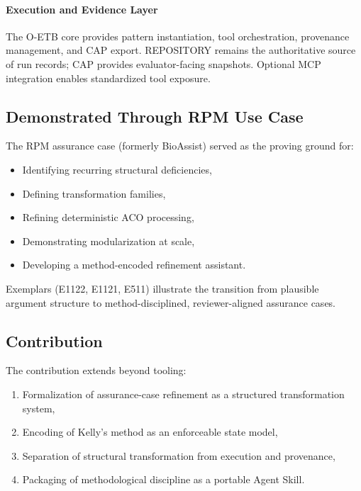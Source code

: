 \documentclass[12pt,twoside,a4paper]{article}
\begin{document}
\paragraph{Execution and Evidence Layer}
The O-ETB core provides pattern instantiation, tool orchestration, provenance management, and CAP export. REPOSITORY remains the authoritative source of run records; CAP provides evaluator-facing snapshots. Optional MCP integration enables standardized tool exposure.

\subsection*{Demonstrated Through RPM Use Case}

The RPM assurance case (formerly BioAssist) served as the proving ground for:

\begin{itemize}
  \item Identifying recurring structural deficiencies,
  \item Defining transformation families,
  \item Refining deterministic ACO processing,
  \item Demonstrating modularization at scale,
  \item Developing a method-encoded refinement assistant.
\end{itemize}

Exemplars (E1122, E1121, E511) illustrate the transition from plausible argument structure to method-disciplined, reviewer-aligned assurance cases.

\subsection*{Contribution}

The contribution extends beyond tooling:

\begin{enumerate}
  \item Formalization of assurance-case refinement as a structured transformation system,
  \item Encoding of Kelly’s method as an enforceable state model,
  \item Separation of structural transformation from execution and provenance,
  \item Packaging of methodological discipline as a portable Agent Skill.
\end{enumerate}
\end{document}
